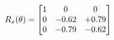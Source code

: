 \documentclass[preview]{standalone}
\begin{document}
\begin{align*}
\special{dvisvgm:raw <g id='unique000'>}R_{x}(\theta) = \begin{bmatrix}1 & 0 & 0 \\0 & -0.62 & +0.79 \\0 & -0.79 & -0.62\end{bmatrix}\special{dvisvgm:raw </g>}
\end{align*}
\end{document}

